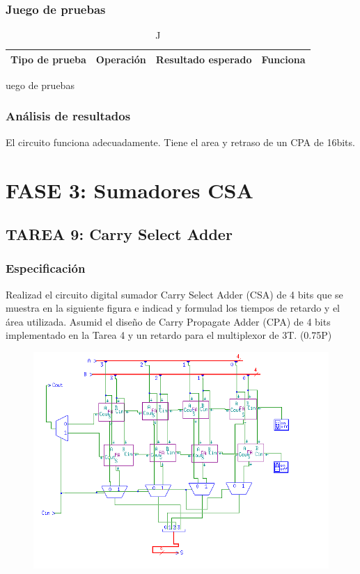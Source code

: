 \documentclass{article}
\begin{document}
		\subsubsection*{Juego de pruebas}
		\begin{table}[h]
			\begin{center}
				\begin{tabular}{| c | c | c | c |}
					\hline
					Tipo de prueba & Operación & Resultado esperado & Funciona \\ \hline
					
					
				\end{tabular}
				\caption Juego de pruebas
			\end{center}
		\end{table}



		\subsubsection*{Análisis de resultados}
		El circuito funciona adecuadamente. Tiene el area y retraso de un CPA de 16bits.

\section{FASE 3: Sumadores CSA}
	\subsection{TAREA 9: Carry Select Adder}
		\subsubsection*{Especificación}
		Realizad el circuito digital sumador Carry Select Adder (CSA) de 4 bits que se muestra
		en la siguiente figura e indicad y formulad los tiempos de retardo y el área utilizada. Asumid el
		diseño de Carry Propagate Adder (CPA) de 4 bits implementado en la Tarea 4 y un retardo para el
		multiplexor de 3T. (0.75P)

		\begin{figure}[ht]
			\includegraphics[width=0.8\linewidth]{CSA}
			\centering
		\end{figure}
\end{document}
